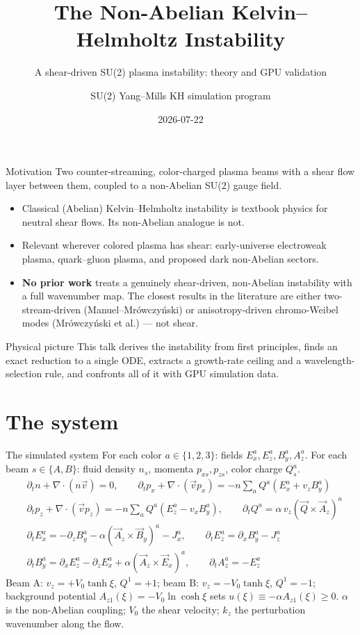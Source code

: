 \documentclass[aspectratio=169,11pt]{beamer}
\title{\textbf{The Non-Abelian Kelvin--Helmholtz Instability}}
\subtitle{A shear-driven SU(2) plasma instability: theory and GPU validation}
\author{SU(2) Yang--Mills KH simulation program}
\date{2026-07-22}
\newenvironment{physpicture}{\begin{exampleblock}{Physical picture}}{\end{exampleblock}}
\newcommand{\Vo}{V_0}
\newcommand{\kz}{k_z}
\newcommand{\Az}{A_{z1}}
\begin{document}
\begin{frame}
\titlepage
\end{frame}

\begin{frame}{Motivation}
Two counter-streaming, color-charged plasma beams with a shear flow layer between
them, coupled to a non-Abelian SU(2) gauge field.
\begin{itemize}
\item Classical (Abelian) Kelvin--Helmholtz instability is textbook physics for
neutral shear flows. Its non-Abelian analogue is not.
\item Relevant wherever colored plasma has shear: early-universe electroweak
plasma, quark--gluon plasma, and proposed dark non-Abelian sectors.
\item \textbf{No prior work} treats a genuinely shear-driven, non-Abelian
instability with a full wavenumber map. The closest results in the literature
are either two-stream-driven (Manuel--Mr\'owczy\'nski) or anisotropy-driven
chromo-Weibel modes (Mr\'owczy\'nski et al.) — not shear.
\end{itemize}
\begin{physpicture}
This talk derives the instability from first principles, finds an exact
reduction to a single ODE, extracts a growth-rate ceiling and a
wavelength-selection rule, and confronts all of it with GPU simulation data.
\end{physpicture}
\end{frame}

\section{The system}

\begin{frame}{The simulated system}
For each color $a\in\{1,2,3\}$: fields $E_x^a,E_z^a,B_y^a,A_z^a$. For each beam
$s\in\{A,B\}$: fluid density $n_s$, momenta $p_{xs},p_{zs}$, color charge $Q_s^a$.
\vspace{0.05em}
\begin{align*}
&\partial_t n+\nabla\!\cdot(n\vec v)=0, \qquad
\partial_t p_x+\nabla\!\cdot(\vec v p_x)=-n\textstyle\sum_a Q^a(E_x^a+v_zB_y^a)\\
&\partial_t p_z+\nabla\!\cdot(\vec v p_z)=-n\textstyle\sum_a Q^a(E_z^a-v_xB_y^a),\qquad
\partial_t Q^a=\alpha\,v_z(\vec Q\times\vec A_z)^a\\[0.3em]
&\partial_t E_x^a=-\partial_zB_y^a-\alpha(\vec A_z\times\vec B_y)^a-J_x^a,\qquad
\partial_t E_z^a=\partial_xB_y^a-J_z^a\\
&\partial_t B_y^a=\partial_xE_z^a-\partial_zE_x^a+\alpha(\vec A_z\times\vec E_x)^a,
\qquad \partial_t A_z^a=-E_z^a
\end{align*}
Beam A: $v_z=+\Vo\tanh\xi$, $Q^1=+1$; beam B: $v_z=-\Vo\tanh\xi$, $Q^1=-1$;
background potential $\Az(\xi)=-\Vo\ln\cosh\xi$ sets $u(\xi)\equiv-\alpha\Az(\xi)\ge0$.
$\alpha$ is the non-Abelian coupling; $\Vo$ the shear velocity; $\kz$ the
perturbation wavenumber along the flow.
\end{frame}
\end{document}
